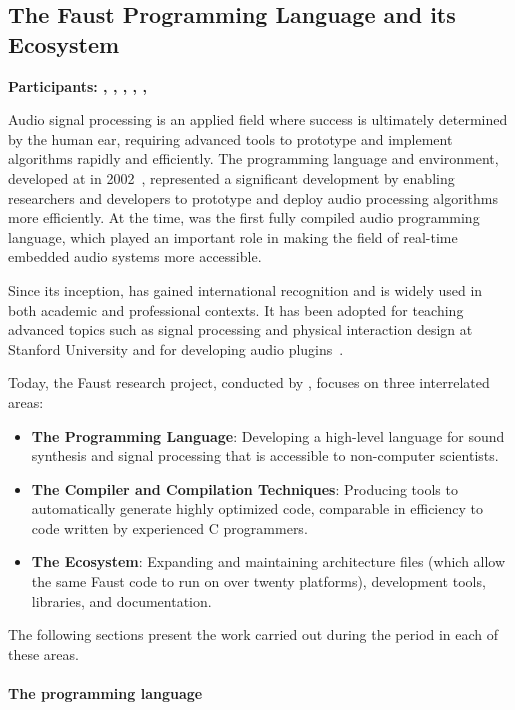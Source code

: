 \subsection{The Faust Programming Language and its Ecosystem} {\bf Participants: \florent, \stephane, \romain,  \yann, \tanguy, \christine}


Audio signal processing is an applied field where success is ultimately determined by the human ear, requiring advanced
tools to prototype and implement algorithms rapidly and efficiently. The \F{} programming language and environment,
developed at \gramecncm in 2002~\cite{orlarey2002}, represented a significant development by enabling researchers and
developers to prototype and deploy audio processing algorithms more efficiently. At the time, \F{} was the first fully
compiled audio programming language, which played an important role in making the field of real-time embedded audio
systems more accessible.  

Since its inception, \F{} has gained international recognition and is widely used in both academic and professional
contexts. It has been adopted for teaching advanced topics such as signal processing and physical interaction design at
Stanford University and for developing audio plugins~\cite{faustLibraries2019}.  

Today, the Faust research project, conducted by \projectname, focuses on three interrelated areas:  
\begin{itemize}
    \item \textbf{The \F{} Programming Language}: Developing a high-level language for sound synthesis and signal processing
    that is accessible to non-computer scientists.
    \item \textbf{The Compiler and Compilation Techniques}: Producing tools to automatically generate highly optimized
    code, comparable in efficiency to code written by experienced C programmers.
    \item \textbf{The Ecosystem}: Expanding and maintaining architecture files (which allow the same Faust code to run
    on over twenty platforms), development tools, libraries, and documentation.
\end{itemize}  

The following sections present the work carried out during the period in each of these areas.

\paragraph{The \F{} programming language}

